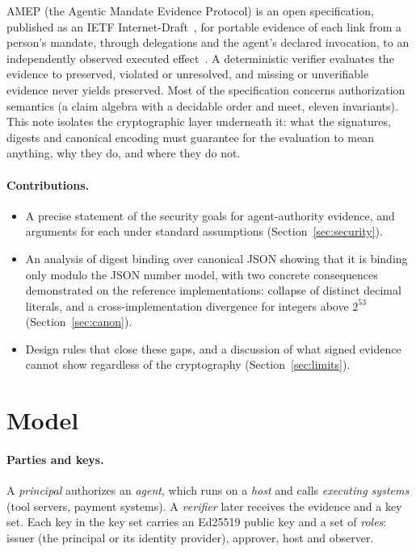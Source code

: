 \documentclass[11pt,a4paper]{article}
\theoremstyle{definition}
\theoremstyle{remark}
\newcommand{\pres}{\textsf{preserved}}
\newcommand{\viol}{\textsf{violated}}
\newcommand{\unres}{\textsf{unresolved}}
\begin{document}
AMEP (the Agentic Mandate Evidence Protocol) is an open specification, published as an IETF Internet-Draft~\cite{amepid}, for portable evidence of each link from a person's mandate, through delegations and the agent's declared invocation, to an independently observed executed effect~\cite{amep}. A deterministic verifier evaluates the evidence to \pres{}, \viol{} or \unres{}, and missing or unverifiable evidence never yields \pres{}. Most of the specification concerns authorization semantics (a claim algebra with a decidable order and meet, eleven invariants). This note isolates the cryptographic layer underneath it: what the signatures, digests and canonical encoding must guarantee for the evaluation to mean anything, why they do, and where they do not.

\paragraph{Contributions.}
\begin{itemize}
\item A precise statement of the security goals for agent-authority evidence, and arguments for each under standard assumptions (Section~\ref{sec:security}).
\item An analysis of digest binding over canonical JSON showing that it is binding only modulo the JSON number model, with two concrete consequences demonstrated on the reference implementations: collapse of distinct decimal literals, and a cross-implementation divergence for integers above $2^{53}$ (Section~\ref{sec:canon}).
\item Design rules that close these gaps, and a discussion of what signed evidence cannot show regardless of the cryptography (Section~\ref{sec:limits}).
\end{itemize}

\section{Model}\label{sec:model}

\paragraph{Parties and keys.} A \emph{principal} authorizes an \emph{agent}, which runs on a \emph{host} and calls \emph{executing systems} (tool servers, payment systems). A \emph{verifier} later receives the evidence and a key set. Each key in the key set carries an Ed25519 public key and a set of \emph{roles}: \textsf{issuer} (the principal or its identity provider), \textsf{approver}, \textsf{host} and \textsf{observer}.
\end{document}
